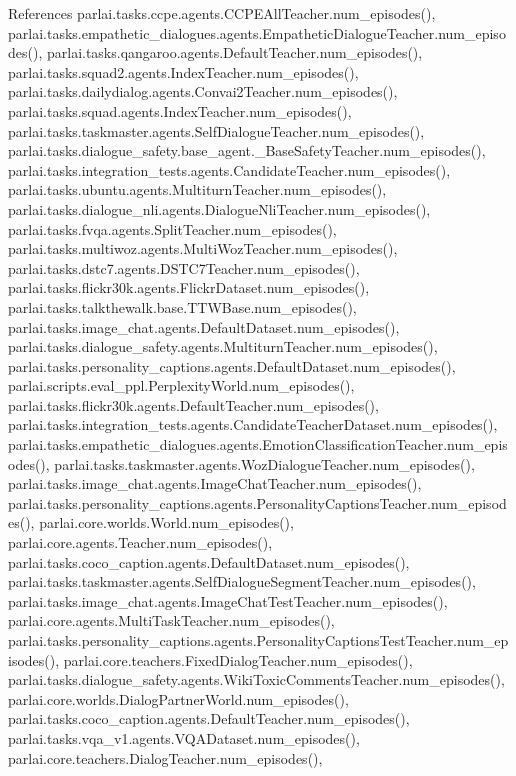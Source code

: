 References parlai.\+tasks.\+ccpe.\+agents.\+C\+C\+P\+E\+All\+Teacher.\+num\+\_\+episodes(), parlai.\+tasks.\+empathetic\+\_\+dialogues.\+agents.\+Empathetic\+Dialogue\+Teacher.\+num\+\_\+episodes(), parlai.\+tasks.\+qangaroo.\+agents.\+Default\+Teacher.\+num\+\_\+episodes(), parlai.\+tasks.\+squad2.\+agents.\+Index\+Teacher.\+num\+\_\+episodes(), parlai.\+tasks.\+dailydialog.\+agents.\+Convai2\+Teacher.\+num\+\_\+episodes(), parlai.\+tasks.\+squad.\+agents.\+Index\+Teacher.\+num\+\_\+episodes(), parlai.\+tasks.\+taskmaster.\+agents.\+Self\+Dialogue\+Teacher.\+num\+\_\+episodes(), parlai.\+tasks.\+dialogue\+\_\+safety.\+base\+\_\+agent.\+\_\+\+Base\+Safety\+Teacher.\+num\+\_\+episodes(), parlai.\+tasks.\+integration\+\_\+tests.\+agents.\+Candidate\+Teacher.\+num\+\_\+episodes(), parlai.\+tasks.\+ubuntu.\+agents.\+Multiturn\+Teacher.\+num\+\_\+episodes(), parlai.\+tasks.\+dialogue\+\_\+nli.\+agents.\+Dialogue\+Nli\+Teacher.\+num\+\_\+episodes(), parlai.\+tasks.\+fvqa.\+agents.\+Split\+Teacher.\+num\+\_\+episodes(), parlai.\+tasks.\+multiwoz.\+agents.\+Multi\+Woz\+Teacher.\+num\+\_\+episodes(), parlai.\+tasks.\+dstc7.\+agents.\+D\+S\+T\+C7\+Teacher.\+num\+\_\+episodes(), parlai.\+tasks.\+flickr30k.\+agents.\+Flickr\+Dataset.\+num\+\_\+episodes(), parlai.\+tasks.\+talkthewalk.\+base.\+T\+T\+W\+Base.\+num\+\_\+episodes(), parlai.\+tasks.\+image\+\_\+chat.\+agents.\+Default\+Dataset.\+num\+\_\+episodes(), parlai.\+tasks.\+dialogue\+\_\+safety.\+agents.\+Multiturn\+Teacher.\+num\+\_\+episodes(), parlai.\+tasks.\+personality\+\_\+captions.\+agents.\+Default\+Dataset.\+num\+\_\+episodes(), parlai.\+scripts.\+eval\+\_\+ppl.\+Perplexity\+World.\+num\+\_\+episodes(), parlai.\+tasks.\+flickr30k.\+agents.\+Default\+Teacher.\+num\+\_\+episodes(), parlai.\+tasks.\+integration\+\_\+tests.\+agents.\+Candidate\+Teacher\+Dataset.\+num\+\_\+episodes(), parlai.\+tasks.\+empathetic\+\_\+dialogues.\+agents.\+Emotion\+Classification\+Teacher.\+num\+\_\+episodes(), parlai.\+tasks.\+taskmaster.\+agents.\+Woz\+Dialogue\+Teacher.\+num\+\_\+episodes(), parlai.\+tasks.\+image\+\_\+chat.\+agents.\+Image\+Chat\+Teacher.\+num\+\_\+episodes(), parlai.\+tasks.\+personality\+\_\+captions.\+agents.\+Personality\+Captions\+Teacher.\+num\+\_\+episodes(), parlai.\+core.\+worlds.\+World.\+num\+\_\+episodes(), parlai.\+core.\+agents.\+Teacher.\+num\+\_\+episodes(), parlai.\+tasks.\+coco\+\_\+caption.\+agents.\+Default\+Dataset.\+num\+\_\+episodes(), parlai.\+tasks.\+taskmaster.\+agents.\+Self\+Dialogue\+Segment\+Teacher.\+num\+\_\+episodes(), parlai.\+tasks.\+image\+\_\+chat.\+agents.\+Image\+Chat\+Test\+Teacher.\+num\+\_\+episodes(), parlai.\+core.\+agents.\+Multi\+Task\+Teacher.\+num\+\_\+episodes(), parlai.\+tasks.\+personality\+\_\+captions.\+agents.\+Personality\+Captions\+Test\+Teacher.\+num\+\_\+episodes(), parlai.\+core.\+teachers.\+Fixed\+Dialog\+Teacher.\+num\+\_\+episodes(), parlai.\+tasks.\+dialogue\+\_\+safety.\+agents.\+Wiki\+Toxic\+Comments\+Teacher.\+num\+\_\+episodes(), parlai.\+core.\+worlds.\+Dialog\+Partner\+World.\+num\+\_\+episodes(), parlai.\+tasks.\+coco\+\_\+caption.\+agents.\+Default\+Teacher.\+num\+\_\+episodes(), parlai.\+tasks.\+vqa\+\_\+v1.\+agents.\+V\+Q\+A\+Dataset.\+num\+\_\+episodes(), parlai.\+core.\+teachers.\+Dialog\+Teacher.\+num\+\_\+episodes(), 